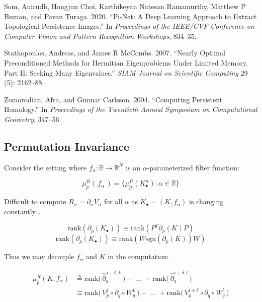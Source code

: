 \documentclass[
  letterpaper,
  DIV=11,
  numbers=noendperiod,
  oneside]{scrartcl}
\newlength{\cslhangindent}
\newlength{\cslentryspacingunit} %
\newenvironment{CSLReferences}[2] %
 {%
  \setlength{\parindent}{0pt}
  \ifodd #1
  \let\oldpar\par
  \def\par{\hangindent=\cslhangindent\oldpar}
  \fi
  \setlength{\parskip}{#2\cslentryspacingunit}
 }%
 {}
\begin{document}
\begin{CSLReferences}{1}{0}
\leavevmode{}%
Som, Anirudh, Hongjun Choi, Karthikeyan Natesan Ramamurthy, Matthew P
Buman, and Pavan Turaga. 2020. {``Pi-Net: A Deep Learning Approach to
Extract Topological Persistence Images.''} In \emph{Proceedings of the
IEEE/CVF Conference on Computer Vision and Pattern Recognition
Workshops}, 834--35.

\leavevmode{}%
Stathopoulos, Andreas, and James R McCombs. 2007. {``Nearly Optimal
Preconditioned Methods for Hermitian Eigenproblems Under Limited Memory.
Part II: Seeking Many Eigenvalues.''} \emph{SIAM Journal on Scientific
Computing} 29 (5): 2162--88.

\leavevmode{}%
Zomorodian, Afra, and Gunnar Carlsson. 2004. {``Computing Persistent
Homology.''} In \emph{Proceedings of the Twentieth Annual Symposium on
Computational Geometry}, 347--56.

\end{CSLReferences}

\hypertarget{permutation-invariance}{%
\subsection{Permutation Invariance}\label{permutation-invariance}}

Consider the setting where \(f_\alpha : \mathbb{R} \to \mathbb{R}^N\) is
an \(\alpha\)-parameterized filter function:

\[ \mu_p^R(\, f_\alpha \, ) = \{ \mu_p^R(K_\bullet^\alpha) : \alpha \in \mathbb{R} \}\]

Difficult to compute \(R_\alpha = \partial_\alpha V_\alpha\) for all
\(\alpha\) as \(K_\bullet = (K, f_\alpha)\) is changing
constantly\ldots{}

\[ \mathrm{rank}(\partial_p(K_\bullet)) \equiv \mathrm{rank}(P^T \partial_p(K) P) \]
\[ \mathrm{rank}(\partial_p(K_\bullet)) \equiv \mathrm{rank}(W \mathrm{sgn}(\partial_p(K)) W) \]

Thus we may decouple \(f_\alpha\) and \(K\) in the computation:

\[
\begin{align*}
 \mu_p^{R}(K,f_\alpha) &\triangleq \mathrm{rank}\big(\,\hat{\partial}_{q}^{j + \delta, k}\,\big) - \; \dots \; + \mathrm{rank}\big(\, \hat{\partial}_{q}^{i + \delta, l}\,\big)  \\
&\equiv \mathrm{rank}\big(\,V_p^j \circ \partial_{q} \circ W_q^k \,\big) - \; \dots \; + \mathrm{rank}\big(\,V_p^{i+\delta} \circ \partial_{q} \circ W_q^l \,\big)
 \end{align*}
 \]
\end{document}
